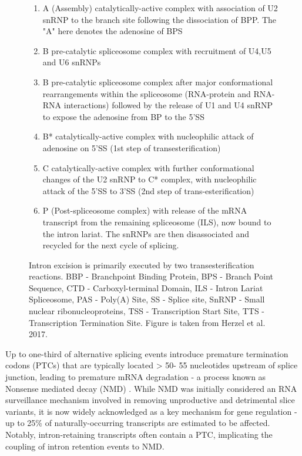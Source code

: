 \begin{figure}[!htp]
{\begin{enumerate}
			\item A (Assembly) catalytically-active complex with association of U2 snRNP to the branch site following the dissociation of BPP. The "A" here denotes the adenosine of BPS
			\item B pre-catalytic spliceosome complex with recruitment of U4,U5 and U6 snRNPs
			\item B pre-catalytic spliceosome complex after major conformational rearrangements within the spliceosome (RNA-protein and RNA-RNA interactions) followed by the release of U1 and U4 snRNP to expose the adenosine from BP to the 5'SS 
			\item B* catalytically-active complex with nucleophilic attack of adenosine on 5'SS (1st step of transesterification) 
			\item C catalytically-active complex with further conformational changes of the U2 snRNP to C* complex, with nucleophilic attack of the 5'SS to 3'SS (2nd step of trans-esterification) 
			\item P (Post-spliceosome complex) with release of the mRNA transcript from the remaining spliceosome (ILS), now bound to the intron lariat. The snRNPs are then disassociated and recycled for the next cycle of splicing.
			\\
		\end{enumerate} 
		Intron excision is primarily executed by two transesterification reactions. BBP - Branchpoint Binding Protein, BPS - Branch Point Sequence, CTD - Carboxyl-terminal Domain, ILS - Intron Lariat Spliceosome, PAS - Poly(A) Site, SS - Splice site, SnRNP - Small nuclear ribonucleoproteins, TSS - Transcription Start Site, TTS - Transcription Termination Site. Figure is taken from Herzel et al. 2017\cite{Herzel2017}.
	}
	\label{fig:AS_mechanism}
\end{figure}

\vspace{1.5cm}
Up to one-third of alternative splicing events introduce premature termination codons (PTCs) that are typically located > 50- 55 nucleotides upstream of splice junction, leading to premature mRNA degradation - a process known as Nonsense mediated decay (NMD)\cite{Lewis2003} . While NMD was initially considered an RNA surveillance mechanism involved in removing unproductive and detrimental slice variants, it is now widely acknowledged as a key mechanism for gene regulation\cite{Nickless2017} - up to 25\% of naturally-occurring transcripts are estimated to be affected\cite{Weischenfeldt2012}. Notably, intron-retaining transcripts often contain a PTC, implicating the coupling of intron retention events to NMD\cite{Wong2013}.     

